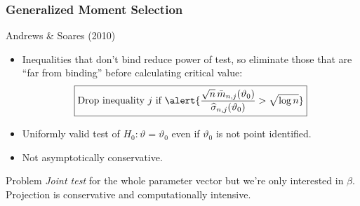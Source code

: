 \documentclass[handout]{beamer}
\begin{document}
\begin{frame}
  \frametitle{Generalized Moment Selection}

  \small

  \begin{block}{Andrews \& Soares (2010)}
    \begin{itemize}
      \item Inequalities that don't bind reduce power of test, so eliminate those that are ``far from binding'' before calculating critical value:
        \[\boxed{\mbox{Drop inequality } j \mbox{ if }  \alert{\displaystyle\frac{\sqrt{n}\,\bar{m}_{n,j}(\vartheta_0)}{\widehat{\sigma}_{n,j}(\vartheta_0)} > \sqrt{\log n}}}\]
      \item Uniformly valid test of $H_0\colon \vartheta = \vartheta_0$ even if $\vartheta_0$ is not point identified. 
      \item Not asymptotically conservative.
    \end{itemize}
  \end{block}


  \begin{block}{Problem}
   \emph{Joint test} for the whole parameter vector but we're only interested in $\beta$.
   Projection is conservative and computationally intensive.
  \end{block}


\end{frame}
\end{document}
